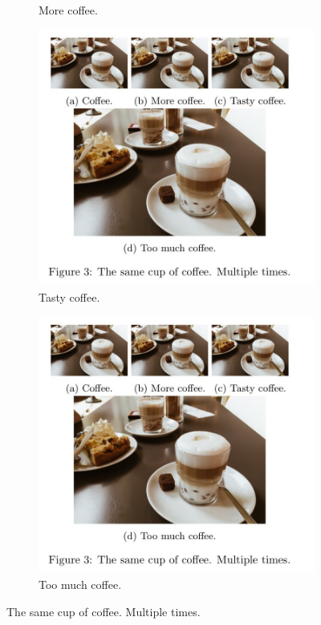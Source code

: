 \documentclass{article}
\begin{document}
\begin{figure}[h!]
\begin{subfigure}[b]{0.2\linewidth}
    \caption{More coffee.}
  \end{subfigure}
  \begin{subfigure}[b]{0.2\linewidth}
    \includegraphics[width=\linewidth]{coffee.jpg}
    \caption{Tasty coffee.}
  \end{subfigure}
  \begin{subfigure}[b]{0.5\linewidth}
    \includegraphics[width=\linewidth]{coffee.jpg}
    \caption{Too much coffee.}
  \end{subfigure}
  \caption{The same cup of coffee. Multiple times.}
  \label{fig:coffee3}
 
\end{figure}
\end{document}
